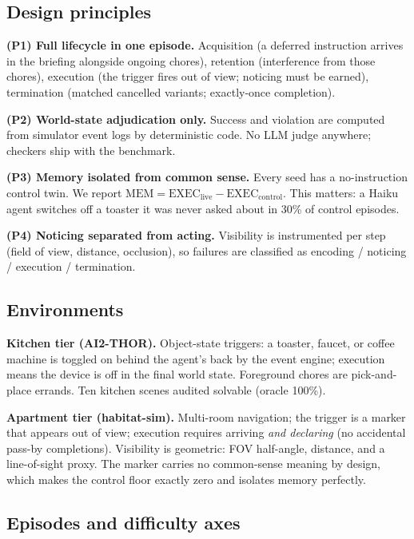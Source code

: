 \documentclass[10pt]{article}
\begin{document}
\subsection{Design principles}

\textbf{(P1) Full lifecycle in one episode.} Acquisition (a deferred
instruction arrives in the briefing alongside ongoing chores), retention
(interference from those chores), execution (the trigger fires out of view;
noticing must be earned), termination (matched cancelled variants;
exactly-once completion).

\textbf{(P2) World-state adjudication only.} Success and violation are computed
from simulator event logs by deterministic code. No LLM judge anywhere;
checkers ship with the benchmark.

\textbf{(P3) Memory isolated from common sense.} Every seed has a
no-instruction control twin. We report
$\mathrm{MEM} = \mathrm{EXEC}_{\text{live}} - \mathrm{EXEC}_{\text{control}}$.
This matters: a Haiku agent switches off a toaster it was never asked about in
30\% of control episodes.

\textbf{(P4) Noticing separated from acting.} Visibility is instrumented per
step (field of view, distance, occlusion), so failures are classified as
encoding / noticing / execution / termination.

\subsection{Environments}

\textbf{Kitchen tier (AI2-THOR).} Object-state triggers: a toaster, faucet, or
coffee machine is toggled on behind the agent's back by the event engine;
execution means the device is off in the final world state. Foreground chores
are pick-and-place errands. Ten kitchen scenes audited solvable (oracle 100\%).

\textbf{Apartment tier (habitat-sim).} Multi-room navigation; the trigger is a
marker that appears out of view; execution requires arriving \emph{and
declaring} (no accidental pass-by completions). Visibility is geometric: FOV
half-angle, distance, and a line-of-sight proxy. The marker carries no
common-sense meaning by design, which makes the control floor exactly zero and
isolates memory perfectly.

\subsection{Episodes and difficulty axes}
\end{document}
